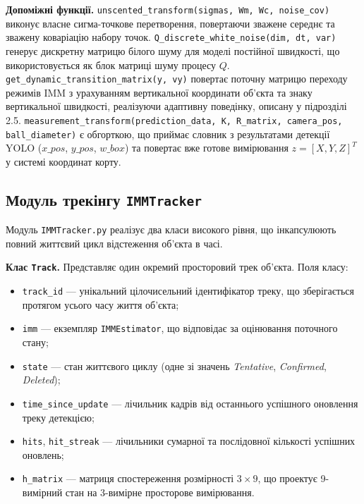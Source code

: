 \textbf{Допоміжні функції.} \texttt{unscented\_transform(sigmas, Wm, Wc, noise\_cov)}
виконує власне сигма-точкове перетворення, повертаючи зважене середнє та зважену
коваріацію набору точок. \texttt{Q\_discrete\_white\_noise(dim, dt, var)} генерує
дискретну матрицю білого шуму для моделі постійної швидкості, що використовується
як блок матриці шуму процесу $Q$. \texttt{get\_dynamic\_transition\_matrix(y, vy)}
повертає поточну матрицю переходу режимів \gls{IMM} з урахуванням вертикальної
координати об'єкта та знаку вертикальної швидкості, реалізуючи адаптивну поведінку,
описану у підрозділі 2.5. \texttt{measurement\_transform(prediction\_data, K,
R\_matrix, camera\_pos, ball\_diameter)} є обгорткою, що приймає словник з
результатами детекції \gls{YOLO} ($x\_pos$, $y\_pos$, $w\_box$) та повертає вже
готове вимірювання $z = [X, Y, Z]^T$ у системі координат корту.

\subsection{Модуль трекінгу \texttt{IMMTracker}}

Модуль \texttt{IMMTracker.py} реалізує два класи високого рівня, що інкапсулюють
повний життєвий цикл відстеження об'єкта в часі.

\textbf{Клас \texttt{Track}.} Представляє один окремий просторовий трек об'єкта.
Поля класу:
\begin{itemize}
    \item \texttt{track\_id} --- унікальний цілочисельний ідентифікатор треку, що
    зберігається протягом усього часу життя об'єкта;
    \item \texttt{imm} --- екземпляр \texttt{IMMEstimator}, що відповідає за
    оцінювання поточного стану;
    \item \texttt{state} --- стан життєвого циклу (одне зі значень \textit{Tentative},
    \textit{Confirmed}, \textit{Deleted});
    \item \texttt{time\_since\_update} --- лічильник кадрів від останнього успішного
    оновлення треку детекцією;
    \item \texttt{hits}, \texttt{hit\_streak} --- лічильники сумарної та послідовної
    кількості успішних оновлень;
    \item \texttt{h\_matrix} --- матриця спостереження розмірності $3 \times 9$, що
    проектує 9-вимірний стан на 3-вимірне просторове вимірювання.
\end{itemize}

